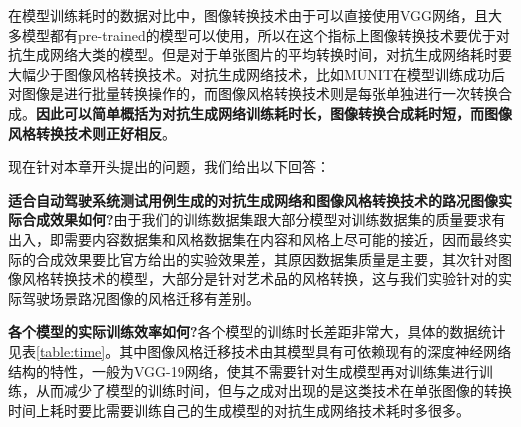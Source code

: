 在模型训练耗时的数据对比中，图像转换技术由于可以直接使用VGG网络，且大多模型都有pre-trained的模型可以使用，所以在这个指标上图像转换技术要优于对抗生成网络大类的模型。但是对于单张图片的平均转换时间，对抗生成网络耗时要大幅少于图像风格转换技术。对抗生成网络技术，比如MUNIT在模型训练成功后对图像是进行批量转换操作的，而图像风格转换技术则是每张单独进行一次转换合成。\textbf{因此可以简单概括为对抗生成网络训练耗时长，图像转换合成耗时短，而图像风格转换技术则正好相反}。

现在针对本章开头提出的问题，我们给出以下回答：

\textbf{适合自动驾驶系统测试用例生成的对抗生成网络和图像风格转换技术的路况图像实际合成效果如何?}\quad 由于我们的训练数据集跟大部分模型对训练数据集的质量要求有出入，即需要内容数据集和风格数据集在内容和风格上尽可能的接近，因而最终实际的合成效果要比官方给出的实验效果差，其原因数据集质量是主要，其次针对图像风格转换技术的模型，大部分是针对艺术品的风格转换，这与我们实验针对的实际驾驶场景路况图像的风格迁移有差别。

\textbf{各个模型的实际训练效率如何?}\quad 各个模型的训练时长差距非常大，具体的数据统计见表\ref{table:time}。其中图像风格迁移技术由其模型具有可依赖现有的深度神经网络结构的特性，一般为VGG-19网络，使其不需要针对生成模型再对训练集进行训练，从而减少了模型的训练时间，但与之成对出现的是这类技术在单张图像的转换时间上耗时要比需要训练自己的生成模型的对抗生成网络技术耗时多很多。

